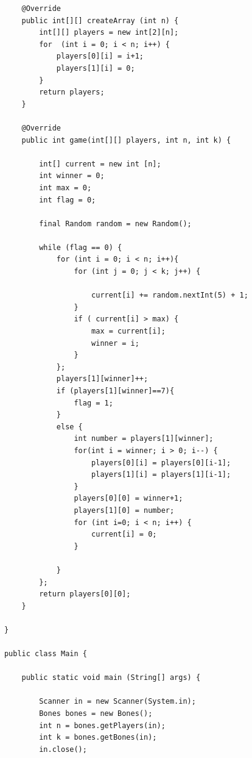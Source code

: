 \documentclass[a4paper]{article}
\begin{document}
\begin{enumerate}
\begin{lstlisting}
                @Override
                public int[][] createArray (int n) {
                    int[][] players = new int[2][n];
                    for  (int i = 0; i < n; i++) {
                        players[0][i] = i+1;
                        players[1][i] = 0;
                    }
                    return players;
                }

                @Override
                public int game(int[][] players, int n, int k) {
                    
                    int[] current = new int [n];
                    int winner = 0;
                    int max = 0;
                    int flag = 0;

                    final Random random = new Random();

                    while (flag == 0) {
                        for (int i = 0; i < n; i++){
                            for (int j = 0; j < k; j++) {
                                
                                current[i] += random.nextInt(5) + 1; 
                            }
                            if ( current[i] > max) {
                                max = current[i];
                                winner = i;
                            }
                        };
                        players[1][winner]++;
                        if (players[1][winner]==7){
                            flag = 1;
                        } 
                        else {
                            int number = players[1][winner];
                            for(int i = winner; i > 0; i--) {
                                players[0][i] = players[0][i-1];
                                players[1][i] = players[1][i-1];
                            }
                            players[0][0] = winner+1;
                            players[1][0] = number;
                            for (int i=0; i < n; i++) {
                                current[i] = 0;
                            }

                        }
                    };
                    return players[0][0];
                }

            }

            public class Main {

                public static void main (String[] args) {

                    Scanner in = new Scanner(System.in);
                    Bones bones = new Bones();
                    int n = bones.getPlayers(in);
                    int k = bones.getBones(in);
                    in.close();


\end{lstlisting}
\end{enumerate}
\end{document}
